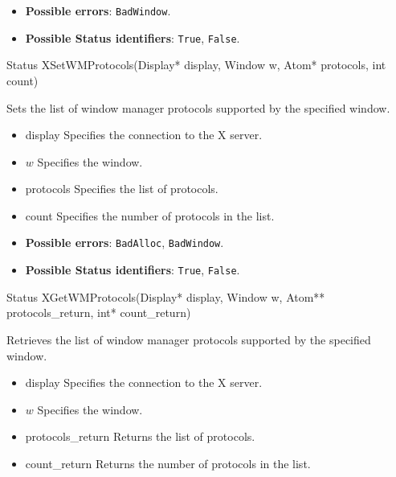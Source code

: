 \documentclass{report}
\begin{document}
\begin{itemize}
            \begin{itemize}
                \item \textbf{Possible errors}: \texttt{BadWindow}.
                \item \textbf{Possible Status identifiers}: \texttt{True}, \texttt{False}.
            \end{itemize}

            \begin{cppcode}
                Status XSetWMProtocols(Display* display, Window w, Atom* protocols, int count)
            \end{cppcode}
            \bigbreak \noindent
            Sets the list of window manager protocols supported by the specified window.

            \begin{itemize}
                \item display Specifies the connection to the X server.
                \item $w$ Specifies the window.
                \item protocols Specifies the list of protocols.
                \item count Specifies the number of protocols in the list.
            \end{itemize}

            \begin{itemize}
                \item \textbf{Possible errors}: \texttt{BadAlloc}, \texttt{BadWindow}.
                \item \textbf{Possible Status identifiers}: \texttt{True}, \texttt{False}.
            \end{itemize}

            \begin{cppcode}
                Status XGetWMProtocols(Display* display, Window w, Atom** protocols_return, int* count_return)
            \end{cppcode}
            \bigbreak \noindent
            Retrieves the list of window manager protocols supported by the specified window.

            \begin{itemize}
                \item display Specifies the connection to the X server.
                \item $w$ Specifies the window.
                \item protocols\_return Returns the list of protocols.
                \item count\_return Returns the number of protocols in the list.
            \end{itemize}


\end{itemize}
\end{document}
